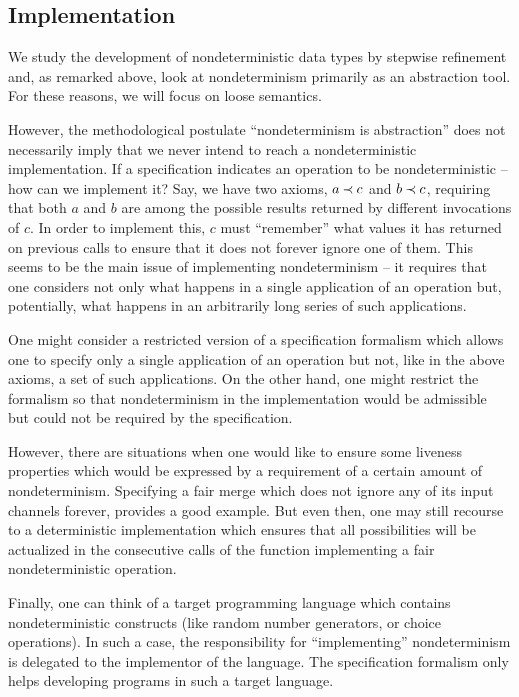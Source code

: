 \subsection{Implementation}
We study the development of nondeterministic data types by stepwise refinement and, as remarked above, look at nondeterminism primarily as an abstraction tool. For these reasons, we will focus on loose semantics. 

However, the methodological postulate ``nondeterminism is abstraction'' does not necessarily imply that we never intend to reach a nondeterministic implementation.
If a specification indicates an operation to be nondeterministic -- how can we
implement
it? Say, we have two axioms, \(a\mathbin{\prec} c\) and \(b\mathbin{\prec} c\), requiring that both $a$ and $b$ are among the possible results returned by different invocations of $c$. In order to implement this, $c$ must ``remember'' what values
it has returned on previous calls to ensure that it does not forever ignore one of them. This seems to be the main issue of implementing nondeterminism -- it requires that one considers not only what happens in a single application of an operation but, potentially, what happens in an arbitrarily long series of such applications. 

One might consider a restricted version of a specification formalism which allows
one to specify only a single application of an operation but not, like in the above axioms, a set of such applications. On the other hand, one might restrict the formalism so that nondeterminism in the implementation would be admissible but could not be required by the specification.

However, there are situations when one would like to ensure some liveness properties which would be expressed by a requirement of a certain amount of
nondeterminism. Specifying a fair merge which does not ignore any of its input channels forever, provides a good example. But even then,
one may still recourse to a deterministic implementation which ensures that all possibilities will be actualized in the consecutive calls of the function implementing a fair nondeterministic operation.

Finally, one can think of a target programming language which contains nondeterministic constructs (like random number generators, or choice operations). In such a case, the responsibility for ``implementing'' nondeterminism is delegated to the implementor of the language. The specification formalism only helps developing programs 
in such a target language.

